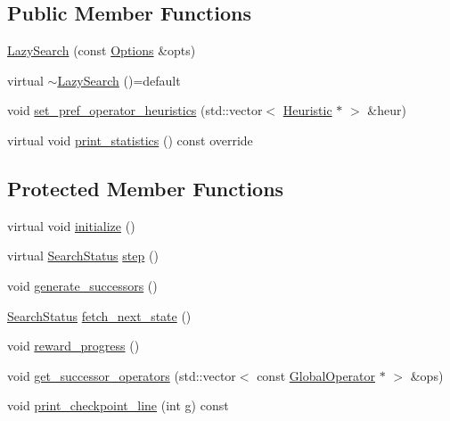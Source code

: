 \subsection*{Public Member Functions}
\begin{DoxyCompactItemize}
\item 
\hyperlink{classLazySearch_a7899b6aab5ec92a59f8c34c3efffde34}{Lazy\-Search} (const \hyperlink{classOptions}{Options} \&opts)
\item 
virtual \hyperlink{classLazySearch_ad2d7c08e418dcc9e604697cca5adccc2}{$\sim$\-Lazy\-Search} ()=default
\item 
void \hyperlink{classLazySearch_aee996209b530866fd5c89a48ef613289}{set\-\_\-pref\-\_\-operator\-\_\-heuristics} (std\-::vector$<$ \hyperlink{classHeuristic}{Heuristic} $\ast$ $>$ \&heur)
\item 
virtual void \hyperlink{classLazySearch_a2a8d856f44fedaa3f040784156789329}{print\-\_\-statistics} () const override
\end{DoxyCompactItemize}
\subsection*{Protected Member Functions}
\begin{DoxyCompactItemize}
\item 
virtual void \hyperlink{classLazySearch_af2ad0d5761ea2a35c64aded9caa4246e}{initialize} ()
\item 
virtual \hyperlink{search__engine_8h_a366b21ffe1b22f34ec2fa8f101b979f3}{Search\-Status} \hyperlink{classLazySearch_a58d840359308153dab0d7c7f39be10bd}{step} ()
\item 
void \hyperlink{classLazySearch_a19cd42338e21b07532404fc3c189a22f}{generate\-\_\-successors} ()
\item 
\hyperlink{search__engine_8h_a366b21ffe1b22f34ec2fa8f101b979f3}{Search\-Status} \hyperlink{classLazySearch_af8bd390a076909a7088dbc5e3dcb41bc}{fetch\-\_\-next\-\_\-state} ()
\item 
void \hyperlink{classLazySearch_a19d3e061ca7656aab252ae80ecbc0cc8}{reward\-\_\-progress} ()
\item 
void \hyperlink{classLazySearch_a89885f82964750088e4bcd53733e7367}{get\-\_\-successor\-\_\-operators} (std\-::vector$<$ const \hyperlink{classGlobalOperator}{Global\-Operator} $\ast$ $>$ \&ops)
\item 
void \hyperlink{classLazySearch_a6964324c7dccddeb40d58c7a4220e110}{print\-\_\-checkpoint\-\_\-line} (int g) const 
\end{DoxyCompactItemize}
